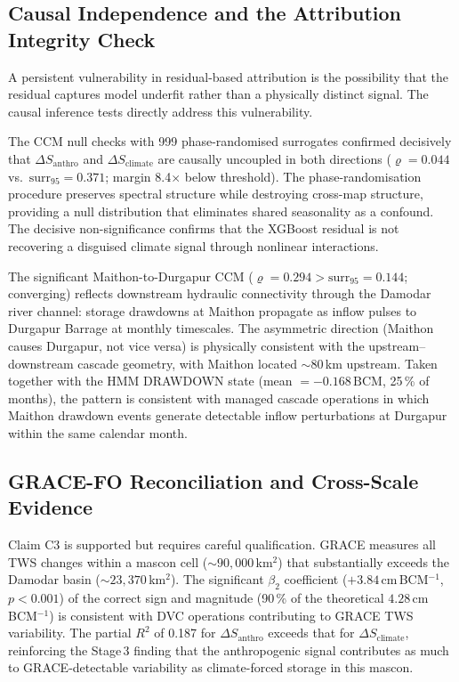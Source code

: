 \documentclass[preprint,12pt,authoryear]{elsarticle}
\newcommand{\dSclim}{\Delta S_{\mathrm{climate}}}
\newcommand{\dSanthro}{\Delta S_{\mathrm{anthro}}}
\newcommand{\BCM}{\,\mathrm{BCM}}
\begin{document}
\subsection{Causal Independence and the Attribution Integrity Check}
\label{sec:disc_causal}

A persistent vulnerability in residual-based attribution is the possibility
that the residual captures model underfit rather than a physically distinct
signal. The causal inference tests directly address this vulnerability.

The CCM null checks with 999 phase-randomised surrogates confirmed decisively
that $\dSanthro$ and $\dSclim$ are causally uncoupled in both directions
($\varrho = 0.044$ vs.\ $\text{surr}_{95} = 0.371$; margin 8.4$\times$ below
threshold). The phase-randomisation procedure \citep{Theiler1992} preserves
spectral structure while destroying cross-map structure, providing a null
distribution that eliminates shared seasonality as a confound. The decisive
non-significance confirms that the XGBoost residual is not recovering a
disguised climate signal through nonlinear interactions.

The significant Maithon-to-Durgapur CCM ($\varrho = 0.294 >
\text{surr}_{95} = 0.144$; converging) reflects downstream hydraulic
connectivity through the Damodar river channel: storage drawdowns at Maithon
propagate as inflow pulses to Durgapur Barrage at monthly timescales. The
asymmetric direction (Maithon causes Durgapur, not vice versa) is physically
consistent with the upstream--downstream cascade geometry, with Maithon
located $\sim 80$\,km upstream. Taken together with the HMM DRAWDOWN state
(mean $= -0.168\BCM$, 25\,\% of months), the pattern is consistent with
managed cascade operations in which Maithon drawdown events generate detectable
inflow perturbations at Durgapur within the same calendar month.

\subsection{GRACE-FO Reconciliation and Cross-Scale Evidence}
\label{sec:disc_grace}

Claim C3 is supported but requires careful qualification. GRACE measures all
TWS changes within a mascon cell ($\sim 90{,}000$\,km$^2$) that substantially
exceeds the Damodar basin ($\sim 23{,}370$\,km$^2$). The significant $\beta_2$
coefficient ($+3.84$\,cm\,BCM$^{-1}$, $p < 0.001$) of the correct sign and
magnitude (90\,\% of the theoretical $4.28$\,cm\,BCM$^{-1}$) is consistent
with DVC operations contributing to GRACE TWS variability. The partial $R^2$
of 0.187 for $\dSanthro$ exceeds that for $\dSclim$, reinforcing the Stage\,3
finding that the anthropogenic signal contributes as much to GRACE-detectable
variability as climate-forced storage in this mascon.
\end{document}
